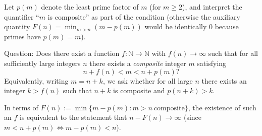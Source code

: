 Let $p(m)$ denote the least prime factor of $m$ (for $m\ge 2$), and interpret the quantifier ``$m$ is composite'' as part of the condition (otherwise the auxiliary quantity $F(n)=\min_{m>n}(m-p(m))$ would be identically $0$ because primes have $p(m)=m$).

Question: Does there exist a function $f:\mathbb{N}\to\mathbb{N}$ with $f(n)\to\infty$ such that for all sufficiently large integers $n$ there exists a \emph{composite} integer $m$ satisfying
\[
 n+f(n)<m<n+p(m)?
\]
Equivalently, writing $m=n+k$, we ask whether for all large $n$ there exists an integer $k>f(n)$ such that $n+k$ is composite and $p(n+k)>k$.

In terms of $F(n):=\min\{m-p(m): m>n\ \text{composite}\}$, the existence of such an $f$ is equivalent to the statement that $n-F(n)\to\infty$ (since $m<n+p(m)\iff m-p(m)<n$).
